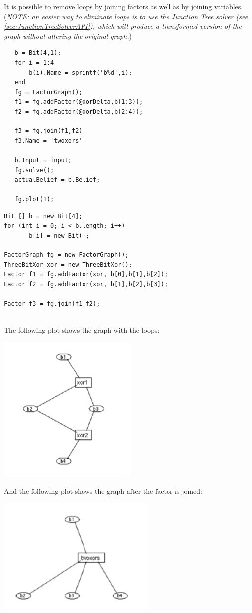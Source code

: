 
It is possible to remove loops by joining factors as well as by joining variables. (\textit{NOTE: an easier way to eliminate loops is to use the Junction Tree solver (see \ref{sec:JunctionTreeSolverAPI}), which will produce a transformed version of the graph without altering the original graph.})

\ifmatlab
\begin{lstlisting}
   b = Bit(4,1);
   for i = 1:4
       b(i).Name = sprintf('b%d',i);
   end
   fg = FactorGraph();
   f1 = fg.addFactor(@xorDelta,b(1:3));
   f2 = fg.addFactor(@xorDelta,b(2:4));
   
   f3 = fg.join(f1,f2);
   f3.Name = 'twoxors';
   
   b.Input = input;
   fg.solve();
   actualBelief = b.Belief;
   
   fg.plot(1);
\end{lstlisting}
\fi

\ifjava
\begin{lstlisting}
Bit [] b = new Bit[4];
for (int i = 0; i < b.length; i++)
	   b[i] = new Bit();
		   
FactorGraph fg = new FactorGraph();
ThreeBitXor xor = new ThreeBitXor();
Factor f1 = fg.addFactor(xor, b[0],b[1],b[2]);
Factor f2 = fg.addFactor(xor, b[1],b[2],b[3]);
		   
Factor f3 = fg.join(f1,f2);
		   
\end{lstlisting}
\fi

The following plot shows the graph with the loops:  
 
\includegraphics{images/LoopyGraph2.png}

And the following plot shows the graph after the factor is joined: 
 
\includegraphics{images/NonLoopyGraph2.png}

